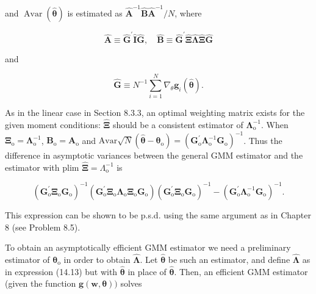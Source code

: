 \documentclass[10pt]{article}
\begin{document}
and $\operatorname{Avar}(\hat{\boldsymbol{\theta}})$ is estimated as $\hat{\mathbf{A}}^{-1} \hat{\mathbf{B}} \hat{\mathbf{A}}^{-1} / N$, where


\begin{equation*}
\hat{\mathbf{A}} \equiv \hat{\mathbf{G}}^{\prime} \hat{\mathbf{I}} \hat{\mathbf{G}}, \quad \hat{\mathbf{B}} \equiv \hat{\mathbf{G}}^{\prime} \hat{\mathbf{\Xi}} \hat{\mathbf{\Lambda}} \hat{\mathbf{\Xi}} \hat{\mathbf{G}} \tag{14.14}
\end{equation*}


and


\begin{equation*}
\hat{\mathbf{G}} \equiv N^{-1} \sum_{i=1}^{N} \nabla_{\theta} \mathbf{g}_{i}(\hat{\boldsymbol{\theta}}) . \tag{14.15}
\end{equation*}


As in the linear case in Section 8.3.3, an optimal weighting matrix exists for the given moment conditions: $\hat{\boldsymbol{\Xi}}$ should be a consistent estimator of $\boldsymbol{\Lambda}_{\mathrm{o}}^{-1}$. When $\boldsymbol{\Xi}_{\mathrm{o}}=\boldsymbol{\Lambda}_{\mathrm{o}}^{-1}$, $\mathbf{B}_{\mathrm{o}}=\mathbf{A}_{\mathrm{o}}$ and $\mathrm{Avar} \sqrt{N}\left(\hat{\boldsymbol{\theta}}-\boldsymbol{\theta}_{\mathrm{o}}\right)=\left(\mathbf{G}_{\mathrm{o}}^{\prime} \boldsymbol{\Lambda}_{\mathrm{o}}^{-1} \mathbf{G}_{\mathrm{o}}\right)^{-1}$. Thus the difference in asymptotic variances between the general GMM estimator and the estimator with plim $\hat{\boldsymbol{\Xi}}= \Lambda_{\mathrm{o}}^{-1}$ is


\begin{equation*}
\left(\mathbf{G}_{\mathrm{o}}^{\prime} \boldsymbol{\Xi}_{\mathrm{o}} \mathbf{G}_{\mathrm{o}}\right)^{-1}\left(\mathbf{G}_{\mathrm{o}}^{\prime} \boldsymbol{\Xi}_{\mathrm{o}} \boldsymbol{\Lambda}_{\mathrm{o}} \boldsymbol{\Xi}_{\mathrm{o}} \mathbf{G}_{\mathrm{o}}\right)\left(\mathbf{G}_{\mathrm{o}}^{\prime} \boldsymbol{\Xi}_{\mathrm{o}} \mathbf{G}_{\mathrm{o}}\right)^{-1}-\left(\mathbf{G}_{\mathrm{o}}^{\prime} \boldsymbol{\Lambda}_{\mathrm{o}}^{-1} \mathbf{G}_{\mathrm{o}}\right)^{-1} . \tag{14.16}
\end{equation*}


This expression can be shown to be p.s.d. using the same argument as in Chapter 8 (see Problem 8.5).

To obtain an asymptotically efficient GMM estimator we need a preliminary estimator of $\boldsymbol{\theta}_{\mathrm{o}}$ in order to obtain $\hat{\boldsymbol{\Lambda}}$. Let $\hat{\boldsymbol{\theta}}$ be such an estimator, and define $\hat{\boldsymbol{\Lambda}}$ as in expression (14.13) but with $\hat{\boldsymbol{\theta}}$ in place of $\hat{\boldsymbol{\theta}}$. Then, an efficient GMM estimator (given the function $\mathbf{g}(\mathbf{w}, \boldsymbol{\theta}))$ solves
\end{document}
